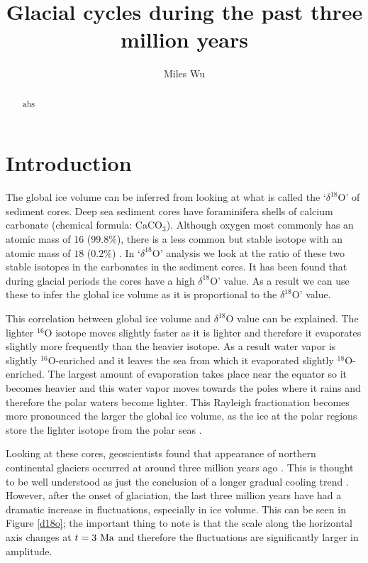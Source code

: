 \documentclass[11pt]{article}
\begin{document}
\title{Glacial cycles during the past three million years}
\author{Miles Wu}
\maketitle

\begin{abstract}
abs
\end{abstract}

\section{Introduction}
The global ice volume can be inferred from looking at what is called the `$\delta^{18}$O' of sediment cores.
Deep sea sediment cores have foraminifera shells of calcium carbonate (chemical formula: CaCO$_3$).
Although oxygen most commonly has an atomic mass of $16$ ($99.8\%$), there is a less common but stable isotope with an atomic mass of $18$ ($0.2\%$) \cite{viu}.
In `$\delta^{18}$O' analysis we look at the ratio of these two stable isotopes in the carbonates in the sediment cores.
It has been found that during glacial periods the cores have a high $\delta^{18}$O' value.
As a result we can use these to infer the global ice volume as it is proportional to the $\delta^{18}$O' value.

This correlation between global ice volume and $\delta^{18}$O value can be explained.
The lighter $^{16}$O isotope moves slightly faster as it is lighter and therefore it evaporates slightly more frequently than the heavier isotope.
As a result water vapor is slightly $^{16}$O-enriched and it leaves the sea from which it evaporated slightly $^{18}$O-enriched.
The largest amount of evaporation takes place near the equator so it becomes heavier and this water vapor moves towards the poles where it rains and therefore the polar waters become lighter.
This Rayleigh fractionation becomes more pronounced the larger the global ice volume, as the ice at the polar regions store the lighter isotope from the polar seas \cite{viu}.

Looking at these cores, geoscientists found that appearance of northern continental glaciers occurred at around three million years ago \cite{fedorov}.
This is thought to be well understood as just the conclusion of a longer gradual cooling trend \cite{huybers}.
However, after the onset of glaciation, the last three million years have had a dramatic increase in fluctuations, especially in ice volume.
This can be seen in Figure \ref{d18o}; the important thing to note is that the scale along the horizontal axis changes at $t=3~\textnormal{Ma}$ and therefore the fluctuations are significantly larger in amplitude.
\end{document}
